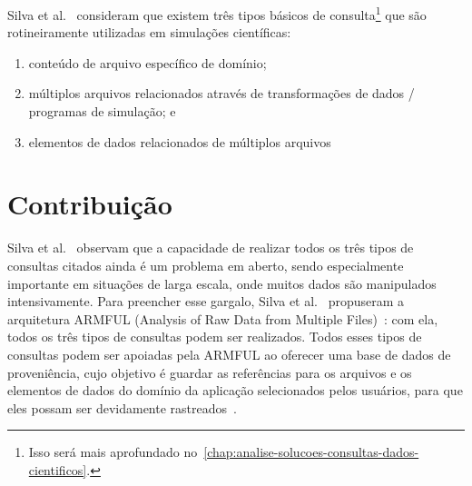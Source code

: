 
Silva et al.~\cite{silva2015analyzing} consideram que existem três tipos básicos de consulta\footnote{Isso será mais aprofundado no~\autoref{chap:analise-solucoes-consultas-dados-cientificos}.} que são rotineiramente utilizadas em simulações científicas:

\begin{enumerate}
    \item conteúdo de arquivo específico de domínio;
    \item múltiplos arquivos relacionados através de transformações de dados / programas de simulação; e
    \item elementos de dados relacionados de múltiplos arquivos
\end{enumerate}


\section{Contribuição}

Silva et al.~\cite{silva2015analyzing} observam que a capacidade de realizar todos os três tipos de consultas citados ainda é um problema em aberto, sendo especialmente importante em situações de larga escala, onde muitos dados são manipulados intensivamente.
Para preencher esse gargalo, Silva et al.~\cite{silva2015analyzing} propuseram a arquitetura  ARMFUL (Analysis of Raw Data from Multiple Files)~\cite{silva2017raw,silva2016situ}: com ela, todos os três tipos de consultas podem ser realizados. Todos esses tipos de consultas podem ser apoiadas pela ARMFUL ao oferecer uma base de dados de proveniência, cujo objetivo é guardar as referências para os arquivos e os elementos de dados do domínio da aplicação selecionados pelos usuários, para que eles possam ser devidamente rastreados~\cite{silva2015analyzing}.


